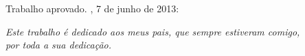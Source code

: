 \documentclass[12pt,oneside,openany,a4paper]{abntex2}	%
\begin{document}
%
% 
%
\begin{folhadeaprovacao}

  \begin{center}
    \vspace*{1cm}
    {\ABNTEXchapterfont\large\imprimirautor}

    \vspace*{\fill}\vspace*{\fill}
    {\ABNTEXchapterfont\bfseries\Large\imprimirtitulo}
    \vspace*{\fill}
    
    \hspace{.45\textwidth}
    \begin{minipage}{.5\textwidth}
        \imprimirpreambulo
    \end{minipage}%
    \vspace*{\fill}
   \end{center}
    
   Trabalho aprovado. \imprimirlocal, 7 de junho de 2013:

      
   \begin{center}
    \vspace*{0.5cm}
    {\large\imprimirlocal}
    \par
    {\large\imprimirdata}
    \vspace*{1cm}
  \end{center}
  
\end{folhadeaprovacao}

\begin{dedicatoria}
   \vspace*{\fill}
   \noindent
   \begin{flushright}
   
   \textit{ Este trabalho é dedicado aos meus pais,  que sempre estiveram comigo, \\ por toda a sua dedicação.}
   \end{flushright}
   
\end{dedicatoria}
\end{document}
